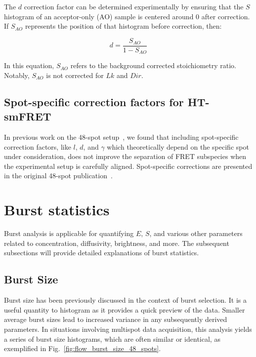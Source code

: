 The $d$ correction factor can be determined experimentally by ensuring that the $S$ histogram of an acceptor-only (AO) sample is centered around 0 after correction. 
If $S_{AO}$ represents the position of that histogram before correction, then:

\begin{equation}
\label{eqn:dir_ao}
d = \frac{S_{AO}}{1-S_{AO}}
\end{equation}

\noindent
In this equation, $S_{AO}$ refers to the background corrected stoichiometry ratio.
Notably, $S_{AO}$ is not corrected for $Lk$ and $Dir$.

\subsection{Spot-specific correction factors for \ac{HT-smFRET}}
\label{sec:spot_corrs_apdx}

In previous work on the 48-spot setup~\cite{ingargiola_JCP_2018}, we found that including spot-specific correction factors, like $l$, $d$, and $\gamma$ which theoretically depend on the specific spot under consideration, does not improve the separation of FRET subspecies when the experimental setup is carefully aligned.
Spot-specific corrections are presented in the original 48-spot publication~\cite{ingargiola_JCP_2018}.

\section{Burst statistics}
\label{sec:burst_stats_apdx}

Burst analysis is applicable for quantifying $E$, $S$, and various other parameters related to concentration, diffusivity, brightness, and more. 
The subsequent subsections will provide detailed explanations of burst statistics.

\subsection{Burst Size}
\label{sec:burst_size_apdx}

Burst size has been previously discussed in the context of burst selection.
It is a useful quantity to histogram as it provides a quick preview of the data. 
Smaller average burst sizes lead to increased variance in any subsequently derived parameters. 
In situations involving multispot data acquisition, this analysis yields a series of burst size histograms, which are often similar or identical, as exemplified in Fig.~\ref{fig:flow_burst_size_48_spots}.

